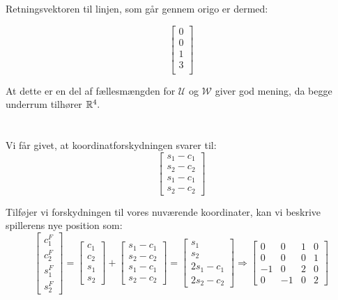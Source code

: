 \documentclass[a4paper,12pt]{article}
\begin{document}
Retningsvektoren til linjen, som går gennem origo er dermed:

\[
\left[\begin{array}{cc}
    0\\
    0\\
    1\\
    3\\
\end{array}\right]
\]

At dette er en del af fællesmængden for $\mathcal{U}$ og $\mathcal{W}$ giver god mening, da begge underrum tilhører $\mathbb{R}^4.$

\section{}
\subsection{}

Vi får givet, at koordinatforskydningen svarer til:\\

\[
\left[\begin{array}{ccc}
    s_1-c_1\\
    s_2-c_2\\
    s_1-c_1\\
    s_2-c_2
\end{array}\right]
\]

Tilføjer vi forskydningen til vores nuværende koordinater, kan vi beskrive spillerens nye position som:\\

\[
\left[\begin{array}{ccc}
    c^F_1\\
    c^F_2\\
    s^F_1\\
    s^F_2
\end{array}\right]
=
\left[\begin{array}{ccc}
    c_1\\
    c_2\\
    s_1\\
    s_2
\end{array}\right]
+
\left[\begin{array}{ccc}
    s_1-c_1\\
    s_2-c_2\\
    s_1-c_1\\
    s_2-c_2
\end{array}\right]
=
\left[\begin{array}{ccc}
    s_1\\
    s_2\\
    2s_1-c_1\\
    2s_2-c_2
\end{array}\right]
\Rightarrow
\left[\begin{array}{cccc}
    0 & 0 & 1 & 0\\
    0 & 0 & 0 & 1\\
    -1 & 0 & 2 & 0\\
    0 & -1 & 0 & 2
\end{array}\right]
\]\\
\end{document}
